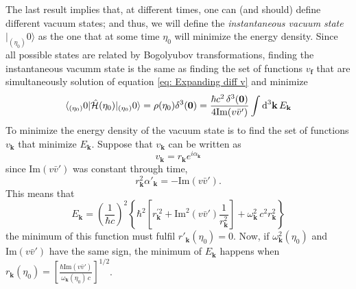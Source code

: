The last result implies that, at different times, one can (and should) define different vacuum states; and thus, we will define the \textit{instantaneous vacuum state} $|_{(\eta_0)}0\rangle$ as the one that at some time $\eta_0$ will minimize the energy density. Since all possible states are related by Bogolyubov transformations, finding the instantaneous vacumm state is the same as finding the set of functions $v_\mathbf{f}$ that are simultaneously solution of equation \ref{eq: Expanding diff v} and minimize
\begin{equation}
	\langle_{(\eta_0)}0|\hat{\mathcal{H}}(\eta_0)|_{(\eta_0)}0\rangle=\rho(\eta_0)\delta^3(\mathbf{0})=\frac{\hbar c^2 \,\delta^3(\mathbf{0})}{4\text{Im}(v\bar v')}\int\text{d}^3\mathbf{k}\,E_\mathbf{k}
\end{equation}
To minimize the energy density of the vacuum state is to find the set of functions $v_\mathbf{k}$ that minimize $E_\mathbf{k}$. Suppose that $v_\mathbf{k}$ can be written as
\begin{equation}
	v_\mathbf{k}=r_\mathbf{k}e^{i\alpha_\mathbf{k}}
\end{equation}
since Im$(v\bar v')$ was constant through time,
\begin{equation}
	r_\mathbf{k}^2\alpha'_\mathbf{k}=-\text{Im}(v\bar v').
\end{equation}
This means that
\begin{equation}
	E_\mathbf{k}=\left(\frac{1}{\hbar c}\right)^2\left\{\hbar^2\left[r^{'2}_\mathbf{k}+\text{Im}^2\left(v\bar v'\right)\frac{1}{r_\mathbf{k}^2}\right]+\omega^2_\mathbf{k}\,c^2r_\mathbf{k}^2\right\}
\end{equation}
the minimum of this function must fulfil $r'_\mathbf{k}(\eta_0)=0$. Now, if $\omega_\mathbf{k}^2(\eta_0)$ and $\text{Im}(v\bar v')$ have the same sign, the minimum of $E_\mathbf{k}$ happens when $r_\mathbf{k}(\eta_0)=\left[\frac{\hbar\text{Im}(v\bar v')}{\omega_\mathbf{k}(\eta_0)\,c}\right]^{1/2}$.

